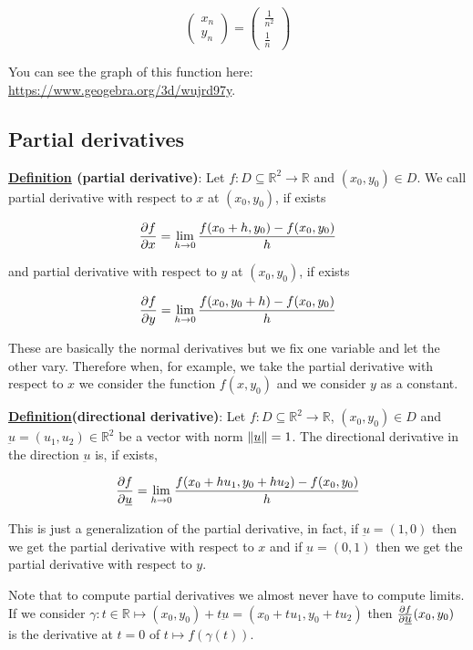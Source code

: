 \documentclass[10pt]{extarticle}
\newcommand{\R}{\mathbb{R}}
\newcommand{\munderbar}[1]{\underbar{\ensuremath{#1}}}
\begin{document}
$$
    \begin{pmatrix}
        x_n \\ y_n
    \end{pmatrix} = \begin{pmatrix}
        \frac{1}{n^2} \\ \frac{1}{n}
    \end{pmatrix}
$$

You can see the graph of this function here:
\url{https://www.geogebra.org/3d/wujrd97y}.

\subsection{Partial derivatives}

\textbf{\underline{Definition} (partial derivative)}: Let $f: D \subseteq \R^2 \to \R$ and $(x_0, y_0) \in D$.
We call partial derivative with respect to $x$ at $(x_0, y_0)$, if exists

$$
    \pdv{f}{x}(x_0, y_0) = \lim_{h \to 0} \frac{f(x_0 + h, y_0) - f(x_0, y_0)}{h}
$$

and partial derivative with respect to $y$ at $(x_0, y_0)$, if exists

$$
    \pdv{f}{y}(x_0, y_0) = \lim_{h \to 0} \frac{f(x_0, y_0 + h) - f(x_0, y_0)}{h}
$$

These are basically the normal derivatives but we fix one variable and let the other vary. Therefore when, for example, we take the partial derivative with respect to $x$ we consider the function $f(x, y_0)$ and we consider $y$ as a constant.

\textbf{\underline{Definition}(directional derivative)}: Let $f: D \subseteq \R^2 \to \R$, $(x_0, y_0) \in D$ and $\munderbar{u} = (u_1, u_2) \in \R^2$ be a vector with norm $\norm{\munderbar{u}} = 1$.
The directional derivative in the direction $\munderbar{u}$ is, if exists,

$$
    \pdv{f}{\munderbar{u}}(x_0, y_0) = \lim_{h \to 0} \frac{f(x_0 + h u_1, y_0 + h u_2) - f(x_0, y_0)}{h}
$$

This is just a generalization of the partial derivative, in fact, if $\munderbar{u} = (1, 0)$ then we get the partial derivative with respect to $x$ and if $\munderbar{u} = (0, 1)$ then we get the partial derivative with respect to $y$.

Note that to compute partial derivatives we almost never have to compute limits. If we consider $\gamma: t \in \R \mapsto (x_0, y_0) + t\munderbar{u} = (x_0 + t u_1, y_0 + t u_2)$ then $\pdv{f}{\munderbar{u}}() (x_0, y_0)$ is the derivative at $t = 0$ of $t \mapsto f(\gamma(t))$.
\end{document}

